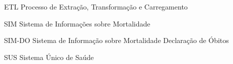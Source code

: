 \begin{siglas}
    
    \item[ETL] Processo de Extração, Transformação e Carregamento
    \item[SIM] Sistema de Informações sobre Mortalidade
    \item[SIM-DO] Sistema de Informação sobre Mortalidade Declaração de Óbitos
    \item[SUS] Sistema Único de Saúde
    
\end{siglas}
